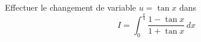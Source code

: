 Effectuer le changement de variable $u=\tan x$ dans
\begin{displaymath}
 I=\int_0^{\frac{\pi}{4}}\frac{1-\tan x}{1+\tan x}\,dx
\end{displaymath}
\bigskip \bigskip